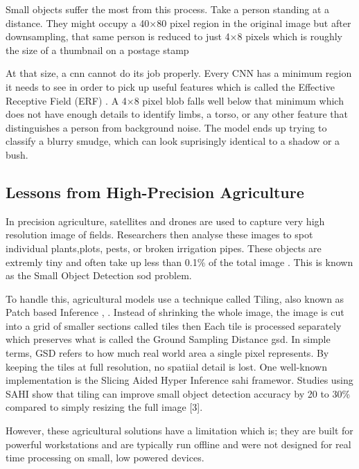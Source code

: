 Small objects suffer the most from this process. Take a person standing at a distance. They might occupy a 40×80 pixel region in the original image but after downsampling, that same person is reduced to just 4×8 pixels which is roughly the size of a thumbnail on a postage stamp

At that size, a \gls{cnn} cannot do its job properly. Every CNN has a minimum region it needs to see in order to pick up useful features which is called the Effective Receptive Field (ERF) \cite{luo2016understanding}. A 4×8 pixel blob falls well below that minimum which does not have enough details to identify limbs, a torso, or any other feature that distinguishes a person from background noise. The model ends up trying to classify a blurry smudge, which can look suprisingly identical to a shadow or a bush.

\subsection*{Lessons from High-Precision Agriculture}
In precision agriculture, satellites and drones are used to capture very high resolution image of fields. Researchers then analyse these images to spot individual plants,plots, pests, or broken irrigation pipes. These objects are extremly tiny and often take up less than 0.1\% of the total image \cite{agriculture2021}. This is known as the Small Object Detection \gls{sod} problem.

To handle this, agricultural models use a technique called Tiling, also known as Patch based Inference \cite{agriculture2021}, \cite{sahi2022}. Instead of shrinking the whole image, the image is cut into a grid of smaller sections called tiles then Each tile is processed separately which preserves what is called the Ground Sampling Distance \gls{gsd}. In simple terms, GSD refers to how much real world area a single pixel represents. By keeping the tiles at full resolution, no spatiial detail is lost. One well-known implementation is the Slicing Aided Hyper Inference \gls{sahi} framewor\cite{sahi2022}. Studies using SAHI show that tiling can improve small object detection accuracy by 20 to 30\% compared to simply resizing the full image [3].

However, these agricultural solutions have a limitation which is; they are built for powerful workstations and are typically run offline and were not designed for real time processing on small, low powered devices. 



